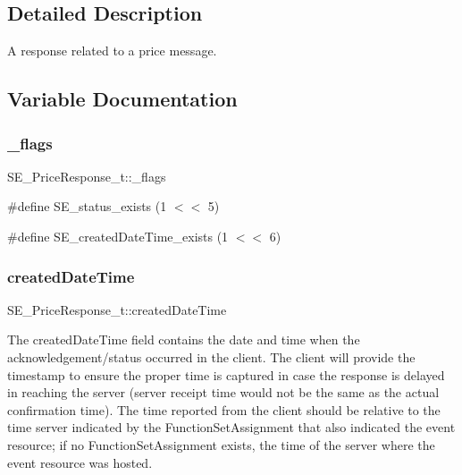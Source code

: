 \subsection{Detailed Description}
A response related to a price message. 

\subsection{Variable Documentation}
\mbox{\label{group__PriceResponse_ga03c805f3561a787a08ee7d85f906c991}} 
\subsubsection{\texorpdfstring{\+\_\+flags}{\_flags}}
{\footnotesize\ttfamily S\+E\+\_\+\+Price\+Response\+\_\+t\+::\+\_\+flags}

\#define S\+E\+\_\+status\+\_\+exists (1 $<$$<$ 5)

\#define S\+E\+\_\+created\+Date\+Time\+\_\+exists (1 $<$$<$ 6) \mbox{\label{group__PriceResponse_gaca058e6a4b9bdabf0802cbab15dc0df2}} 
\subsubsection{\texorpdfstring{created\+Date\+Time}{createdDateTime}}
{\footnotesize\ttfamily S\+E\+\_\+\+Price\+Response\+\_\+t\+::created\+Date\+Time}

The created\+Date\+Time field contains the date and time when the acknowledgement/status occurred in the client. The client will provide the timestamp to ensure the proper time is captured in case the response is delayed in reaching the server (server receipt time would not be the same as the actual confirmation time). The time reported from the client should be relative to the time server indicated by the Function\+Set\+Assignment that also indicated the event resource; if no Function\+Set\+Assignment exists, the time of the server where the event resource was hosted. \mbox{\label{group__PriceResponse_ga690190c08ea8f2142672cca33e552a08}} 

